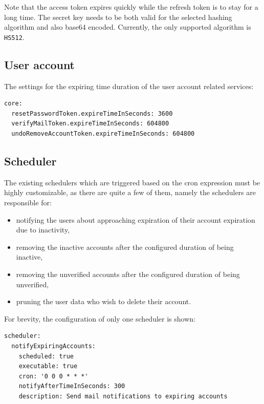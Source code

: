 \documentclass[a4paper,twoside,12pt]{book}
\begin{document}
Note that the access token expires quickly while the refresh token is to stay for a long time. The secret key needs to be both valid for the selected hashing algorithm and also base64 encoded. Currently, the only supported algorithm is \verb|HS512|.

\subsection{User account}

The settings for the expiring time duration of the user account related services:

\begin{verbatim}
core:
  resetPasswordToken.expireTimeInSeconds: 3600
  verifyMailToken.expireTimeInSeconds: 604800
  undoRemoveAccountToken.expireTimeInSeconds: 604800
\end{verbatim}

\subsection{Scheduler}

The existing schedulers which are triggered based on the cron expression must be highly customizable, as there are quite a few of them, namely the schedulers are responsible for:
\begin{itemize}
\item notifying the users about approaching expiration of their account expiration due to inactivity,
\item removing the inactive accounts after the configured duration of being inactive,
\item removing the unverified accounts after the configured duration of being unverified,
\item pruning the user data who wish to delete their account.
\end{itemize}

For brevity, the configuration of only one scheduler is shown:
\begin{verbatim}
scheduler:
  notifyExpiringAccounts:
    scheduled: true
    executable: true
    cron: '0 0 0 * * *'
    notifyAfterTimeInSeconds: 300
    description: Send mail notifications to expiring accounts
\end{verbatim}
\end{document}
